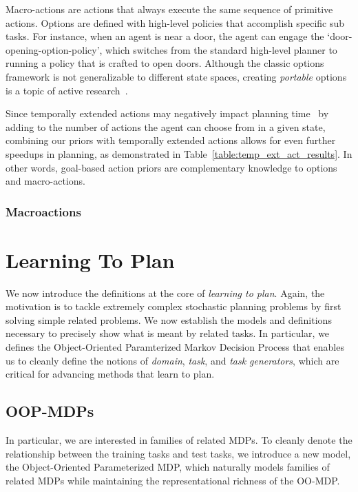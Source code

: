 \documentclass[11pt]{article}
\begin{document}
  Macro-actions are actions that always
execute the same sequence of primitive actions. Options are defined
with high-level policies that accomplish specific sub tasks. For
instance, when an agent is near a door, the agent can engage the
`door-opening-option-policy', which switches from the standard
high-level planner to running a policy that is crafted to open doors.
Although the classic options framework is not generalizable to
different state spaces, creating {\em portable} options is a topic of
active
research~\cite{konidaris07,konidaris2009efficient,Ravindran03analgebraic,andre2002state,konidaris2012transfer}.

Since temporally extended actions may negatively impact planning
time~\cite{Jong:2008zr} by adding to the number of actions the agent
can choose from in a given state, combining our priors with
temporally extended actions allows for even further speedups in
planning, as demonstrated in Table~\ref{table:temp_ext_act_results}. In
other words, goal-based action priors are complementary knowledge to options and
macro-actions.


\subsubsection{Macroactions}



\section{Learning To Plan}
\label{sec:learn_to_plan}

We now introduce the definitions at the core of {\it learning to plan}. Again, the motivation is to tackle extremely complex stochastic planning problems by first solving simple related problems. We now establish the models and definitions necessary to precisely show what is meant by related tasks. In particular, we defines the Object-Oriented Paramterized Markov Decision Process that enables us to cleanly define the notions of {\it domain}, {\it task}, and {\it task generators}, which are critical for advancing methods that learn to plan.

\subsection{OOP-MDPs}
In particular, we are interested in families of related MDPs. To cleanly denote the relationship between the training tasks and test tasks, we introduce a new model, the Object-Oriented Parameterized MDP, which naturally models families of related MDPs while maintaining the representational richness of the OO-MDP. \\
\end{document}
